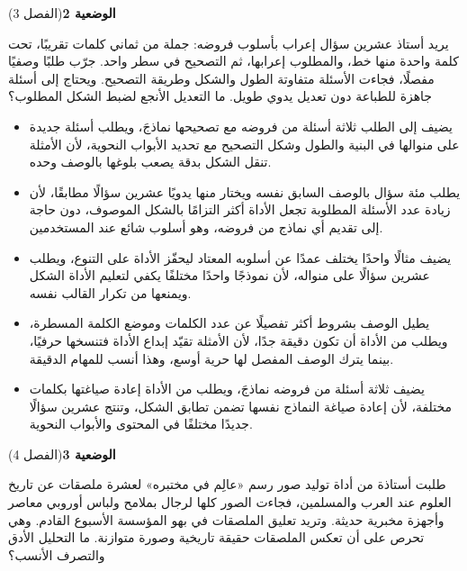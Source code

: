 \documentclass[11pt,a4paper]{article}
\begin{document}
\par\vspace{6pt}
\noindent
{\large\khatt\textbf{الوضعية 2}}\hfill{\small(الفصل 3)}\par\nopagebreak\vspace{3pt}
\setlength{\fboxsep}{7pt}\colorbox{gray!10}{\parbox{\dimexpr\linewidth-14pt}{يريد أستاذ عشرين سؤال إعراب بأسلوب فروضه: جملة من ثماني كلمات تقريبًا، تحت كلمة واحدة منها خط، والمطلوب إعرابها، ثم التصحيح في سطر واحد. جرّب طلبًا وصفيًا مفصلًا، فجاءت الأسئلة متفاوتة الطول والشكل وطريقة التصحيح. ويحتاج إلى أسئلة جاهزة للطباعة دون تعديل يدوي طويل. ما التعديل الأنجع لضبط الشكل المطلوب؟}}\par\nopagebreak
\begin{itemize}[leftmargin=1.0cm, labelsep=6pt, itemsep=3pt, topsep=4pt, parsep=0pt]
  \item[\textbf{أ)}] يضيف إلى الطلب ثلاثة أسئلة من فروضه مع تصحيحها نماذجَ، ويطلب أسئلة جديدة على منوالها في البنية والطول وشكل التصحيح مع تحديد الأبواب النحوية، لأن الأمثلة تنقل الشكل بدقة يصعب بلوغها بالوصف وحده.
  \item[\textbf{ب)}] يطلب مئة سؤال بالوصف السابق نفسه ويختار منها يدويًا عشرين سؤالًا مطابقًا، لأن زيادة عدد الأسئلة المطلوبة تجعل الأداة أكثر التزامًا بالشكل الموصوف، دون حاجة إلى تقديم أي نماذج من فروضه، وهو أسلوب شائع عند المستخدمين.
  \item[\textbf{ج)}] يضيف مثالًا واحدًا يختلف عمدًا عن أسلوبه المعتاد ليحفّز الأداة على التنوع، ويطلب عشرين سؤالًا على منواله، لأن نموذجًا واحدًا مختلفًا يكفي لتعليم الأداة الشكل ويمنعها من تكرار القالب نفسه.
  \item[\textbf{د)}] يطيل الوصف بشروط أكثر تفصيلًا عن عدد الكلمات وموضع الكلمة المسطرة، ويطلب من الأداة أن تكون دقيقة جدًا، لأن الأمثلة تقيّد إبداع الأداة فتنسخها حرفيًا، بينما يترك الوصف المفصل لها حرية أوسع، وهذا أنسب للمهام الدقيقة.
  \item[\textbf{هـ)}] يضيف ثلاثة أسئلة من فروضه نماذجَ، ويطلب من الأداة إعادة صياغتها بكلمات مختلفة، لأن إعادة صياغة النماذج نفسها تضمن تطابق الشكل، وتنتج عشرين سؤالًا جديدًا مختلفًا في المحتوى والأبواب النحوية.
\end{itemize}
\par\vspace{6pt}
\noindent
{\large\khatt\textbf{الوضعية 3}}\hfill{\small(الفصل 4)}\par\nopagebreak\vspace{3pt}
\setlength{\fboxsep}{7pt}\colorbox{gray!10}{\parbox{\dimexpr\linewidth-14pt}{طلبت أستاذة من أداة توليد صور رسم «عالِم في مختبره» لعشرة ملصقات عن تاريخ العلوم عند العرب والمسلمين، فجاءت الصور كلها لرجال بملامح ولباس أوروبي معاصر وأجهزة مخبرية حديثة. وتريد تعليق الملصقات في بهو المؤسسة الأسبوع القادم. وهي تحرص على أن تعكس الملصقات حقيقة تاريخية وصورة متوازنة. ما التحليل الأدق والتصرف الأنسب؟}}\par\nopagebreak
\end{document}
